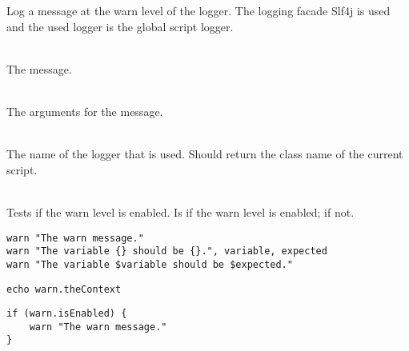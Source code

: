 %


Log a message at the warn level of the logger.
The logging facade Slf4j\cite{slf4j13} is used and the used logger is
the global script logger.

\begin{asparadesc}
%
\item[\code{message}] \hfill \\
The message.
%
\item[\code{args}] \hfill \\
The arguments for the message.
%
\item[\code{theContext}] \hfill \\
The name of the logger that is used. Should return the class name of the current
script.
%
\item[\code{isEnabled}] \hfill \\
Tests if the warn level is enabled. Is  if the warn level is enabled;
 if not.
%
\end{asparadesc}

\begin{lstlisting}[style=Groovybash, label={lst:example_warn1}, title={%
Outputs a warn logging message with arguments.}]
warn "The warn message."
warn "The variable {} should be {}.", variable, expected
warn "The variable $variable should be $expected."
\end{lstlisting}

\begin{lstlisting}[style=Groovybash, label={lst:example_warn2}, title={%
Prints the name of the current logger.}]
echo warn.theContext
\end{lstlisting}

\begin{lstlisting}[style=Groovybash, label={lst:example_warn3}, title={%
Tests if the warn level is enabled.}]
if (warn.isEnabled) {
    warn "The warn message."
}
\end{lstlisting}

